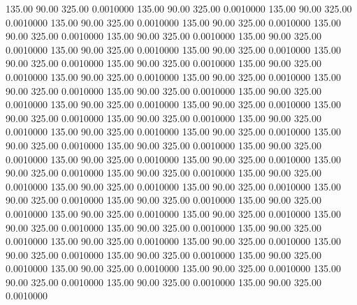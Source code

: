  135.00   90.00  325.00   0.0010000
 135.00   90.00  325.00   0.0010000
 135.00   90.00  325.00   0.0010000
 135.00   90.00  325.00   0.0010000
 135.00   90.00  325.00   0.0010000
 135.00   90.00  325.00   0.0010000
 135.00   90.00  325.00   0.0010000
 135.00   90.00  325.00   0.0010000
 135.00   90.00  325.00   0.0010000
 135.00   90.00  325.00   0.0010000
 135.00   90.00  325.00   0.0010000
 135.00   90.00  325.00   0.0010000
 135.00   90.00  325.00   0.0010000
 135.00   90.00  325.00   0.0010000
 135.00   90.00  325.00   0.0010000
 135.00   90.00  325.00   0.0010000
 135.00   90.00  325.00   0.0010000
 135.00   90.00  325.00   0.0010000
 135.00   90.00  325.00   0.0010000
 135.00   90.00  325.00   0.0010000
 135.00   90.00  325.00   0.0010000
 135.00   90.00  325.00   0.0010000
 135.00   90.00  325.00   0.0010000
 135.00   90.00  325.00   0.0010000
 135.00   90.00  325.00   0.0010000
 135.00   90.00  325.00   0.0010000
 135.00   90.00  325.00   0.0010000
 135.00   90.00  325.00   0.0010000
 135.00   90.00  325.00   0.0010000
 135.00   90.00  325.00   0.0010000
 135.00   90.00  325.00   0.0010000
 135.00   90.00  325.00   0.0010000
 135.00   90.00  325.00   0.0010000
 135.00   90.00  325.00   0.0010000
 135.00   90.00  325.00   0.0010000
 135.00   90.00  325.00   0.0010000
 135.00   90.00  325.00   0.0010000
 135.00   90.00  325.00   0.0010000
 135.00   90.00  325.00   0.0010000
 135.00   90.00  325.00   0.0010000
 135.00   90.00  325.00   0.0010000
 135.00   90.00  325.00   0.0010000
 135.00   90.00  325.00   0.0010000
 135.00   90.00  325.00   0.0010000
 135.00   90.00  325.00   0.0010000
 135.00   90.00  325.00   0.0010000
 135.00   90.00  325.00   0.0010000
 135.00   90.00  325.00   0.0010000
 135.00   90.00  325.00   0.0010000
 135.00   90.00  325.00   0.0010000
 135.00   90.00  325.00   0.0010000
 135.00   90.00  325.00   0.0010000
 135.00   90.00  325.00   0.0010000
